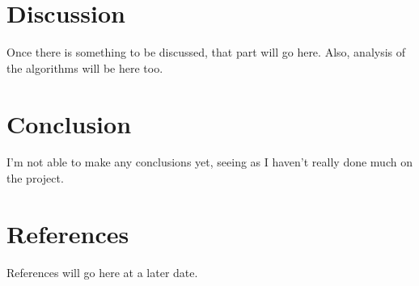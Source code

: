 \documentclass[a4paper]{article}
\begin{document}
\section{Discussion}
Once there is something to be discussed, that part will go here. Also, analysis of the algorithms will be here too.
\section{Conclusion}
I'm not able to make any conclusions yet, seeing as I haven't really done much on the project. 
\section{References}
References will go here at a later date.
\end{document}
